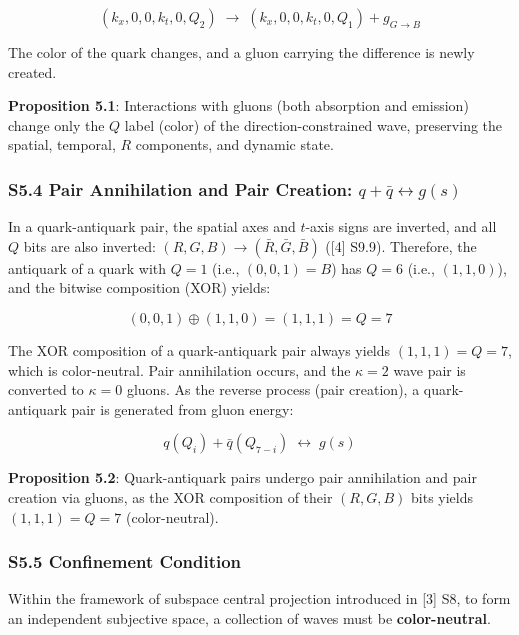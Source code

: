 \documentclass[
  a4paper,11pt]{article}
\theoremstyle{definition}
\theoremstyle{remark}
\begin{document}
\[(k_x, 0, 0, k_t, 0, Q_{2}) \;\longrightarrow\; (k_x, 0, 0, k_t, 0, Q_{1}) + g_{G \to B}\]

The color of the quark changes, and a gluon carrying the difference is
newly created.

\textbf{Proposition 5.1}: Interactions with gluons (both absorption and
emission) change only the \(Q\) label (color) of the
direction-constrained wave, preserving the spatial, temporal, \(R\)
components, and dynamic state.

\subsubsection{\texorpdfstring{S5.4 Pair Annihilation and Pair Creation:
\(q + \bar{q} \leftrightarrow g(s)\)}{S5.4 Pair Annihilation and Pair Creation: q + \textbackslash bar\{q\} \textbackslash leftrightarrow g(s)}}\label{s5.4-pair-annihilation-and-pair-creation-q-barq-leftrightarrow-gs}

In a quark-antiquark pair, the spatial axes and \(t\)-axis signs are
inverted, and all \(Q\) bits are also inverted:
\((R, G, B) \to (\bar{R}, \bar{G}, \bar{B})\) ({[}4{]} S9.9). Therefore,
the antiquark of a quark with \(Q = 1\) (i.e., \((0,0,1) = B\)) has
\(Q = 6\) (i.e., \((1,1,0)\)), and the bitwise composition (XOR) yields:

\[(0,0,1) \oplus (1,1,0) = (1,1,1) = Q = 7\]

The XOR composition of a quark-antiquark pair always yields
\((1,1,1) = Q = 7\), which is color-neutral. Pair annihilation occurs,
and the \(\kappa = 2\) wave pair is converted to \(\kappa = 0\) gluons.
As the reverse process (pair creation), a quark-antiquark pair is
generated from gluon energy:

\[q(Q_i) + \bar{q}(Q_{7-i}) \;\longleftrightarrow\; g(s)\]

\textbf{Proposition 5.2}: Quark-antiquark pairs undergo pair
annihilation and pair creation via gluons, as the XOR composition of
their \((R, G, B)\) bits yields \((1,1,1) = Q = 7\) (color-neutral).

\subsubsection{S5.5 Confinement
Condition}\label{s5.5-confinement-condition}

Within the framework of subspace central projection introduced in
{[}3{]} S8, to form an independent subjective space, a collection of
waves must be \textbf{color-neutral}.
\end{document}
